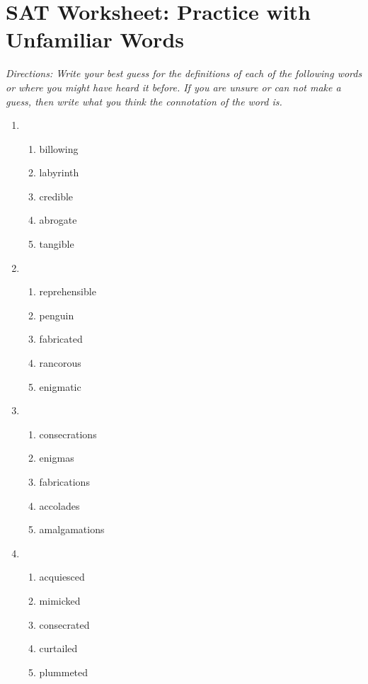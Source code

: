 \section{SAT Worksheet: Practice with Unfamiliar Words}

\textit{Directions: Write your best guess for the definitions of each of the following words or where you might have heard it before. If you are unsure or can not make a guess, then write what you think the connotation of the word is.} 

\begin{spacing}{1.5}
\begin{enumerate}
\item
\begin{enumerate}[label=(\Alph*)]
\item billowing  \hrulefill
\item labyrinth \hrulefill
\item credible \hrulefill
\item abrogate \hrulefill
\item tangible \hrulefill
\end{enumerate}

\item    
\begin{enumerate}[label=(\Alph*)] 
\item reprehensible \hrulefill
\item penguin  \hrulefill
\item fabricated \hrulefill
\item rancorous \hrulefill
\item enigmatic   \hrulefill
\end{enumerate}

\item 
\begin{enumerate} [label=(\Alph*)]
\item consecrations \hrulefill
\item enigmas \hrulefill
\item fabrications \hrulefill
\item accolades \hrulefill
\item amalgamations  \hrulefill
\end{enumerate}

\item 
\begin{enumerate} [label=(\Alph*)]
\item acquiesced \hrulefill
\item mimicked  \hrulefill
\item consecrated \hrulefill
\item curtailed \hrulefill
\item plummeted \hrulefill
\end{enumerate}
\end{enumerate}
\end{spacing}